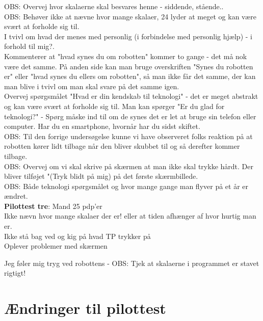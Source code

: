 OBS: Overvej hvor skalaerne skal besvares henne - siddende, stående..\\

OBS: Behøver ikke at nævne hvor mange skalaer, 24 lyder at meget og kan være svært at forholde sig til.\\ 

I tvivl om hvad der menes med personlig (i forbindelse med personlig hjælp) - i forhold til mig?.\\ 

Kommenterer at "hvad synes du om robotten" kommer to gange - det må nok være det samme. På anden side kan man bruge overskriften "Synes du robotten er" eller "hvad synes du ellers om robotten", så man ikke får det samme, der kan man blive i tvivl om man skal svare på det samme igen. \\

Overvej spørgsmålet "Hvad er din kendskab til teknologi" - det er meget abstrakt og kan være svært at forholde sig til. Man kan spørger "Er du glad for teknologi?" - Spørg måske ind til om de synes det er let at bruge sin telefon eller computer. Har du en smartphone, hvornår har du sidst skiftet. \\ 

OBS: Til den forrige undersøgelse kunne vi have observeret folks reaktion på at robotten kører lidt tilbage når den bliver skubbet til og så derefter kommer tilbage.\\

OBS: Overvej om vi skal skrive på skærmen at man ikke skal trykke hårdt.  Der bliver tilføjet "(Tryk blidt på mig) på det første skærmbillede.\\

OBS: Både teknologi spørgsmålet og hvor mange gange man flyver på et år er ændret. \\

\textbf{Pilottest tre}: Mand 25 pdp'er\\
Ikke nævn hvor mange skalaer der er! eller at tiden afhænger af hvor hurtig man er.\\

Ikke stå bag ved og kig på hvad TP trykker på\\

Oplever problemer med skærmen

Jeg føler mig tryg ved robottens - OBS: Tjek at skalaerne i programmet er stavet rigtigt!


\section{Ændringer til pilottest}

